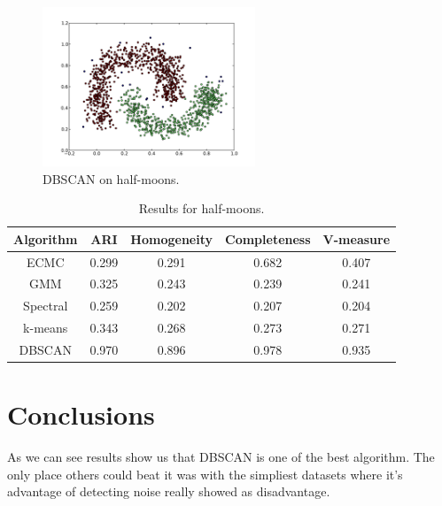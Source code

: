\documentclass[conference]{IEEEtran}
\begin{document}
\begin{figure}[th]
\centering
\includegraphics[width=15pc]{dbscan_half-moons.pdf}
\caption{DBSCAN on half-moons.}
\label{DBSCAN_halfmoons}
\end{figure}

\begin{table}[htbp]
\caption{Results for half-moons.}
\label{halfmoonsresults}
\begin{center}
\setlength{\tabcolsep}{3pt}
\begin{tabular}{ |c|c|c|c|c| }
\hline
	Algorithm & ARI & Homogeneity & Completeness & V-measure\\ \hline
	
	ECMC & 0.299 & 0.291 & 0.682 & 0.407 \\ \hline
	GMM & 0.325 & 0.243 & 0.239 & 0.241 \\ \hline
	Spectral & 0.259 & 0.202 & 0.207 & 0.204 \\ \hline
	k-means & 0.343 & 0.268 & 0.273 & 0.271 \\ \hline
	DBSCAN & 0.970 & 0.896 & 0.978 & 0.935 \\ \hline
\end{tabular}
\end{center}
\end{table}


\section{Conclusions}

As we can see results show us that DBSCAN is one of the best algorithm. The only place others
could beat it was with the simpliest datasets where it's advantage of detecting noise really showed
as disadvantage.
\end{document}
